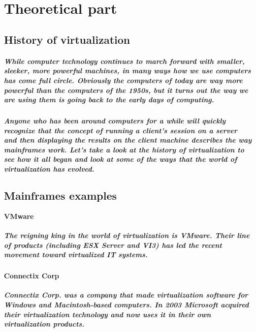 \chapter{Theoretical part}

\section{History of virtualization}

\paragraph{While computer technology continues to march forward with smaller, sleeker, more powerful machines, in many ways how we use computers has come full circle.
Obviously the computers of today are way more powerful than the computers of the 1950s, but it turns out the way we are using them is going back to the early days 
of computing.}

\paragraph{Anyone who has been around computers for a while will quickly recognize that the concept of running a client’s session on a server and then displaying the 
results on the client machine describes the way mainframes work.  Let’s take a look at the history of virtualization to see how it all began and look at some of the 
ways that the world of virtualization has evolved.}

\section{Mainframes examples}

\textbf{VMware}
\paragraph{The reigning king in the world of virtualization is VMware. Their line of products (including ESX Server and VI3) has led the recent movement toward 
virtualized IT systems.}

\textbf{Connectix Corp}
\paragraph{Connectix Corp. was a company that made virtualization software for Windows and Macintosh-based computers. In 2003 Microsoft acquired their virtualization 
technology and now uses it in their own virtualization products.}


